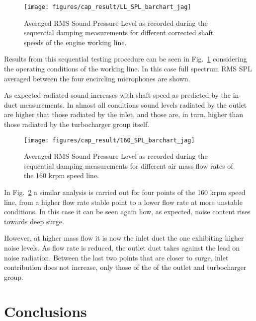 \begin{figure}[tbh!]
\centering
\texttt{[image: figures/cap\_result/LL\_SPL\_barchart\_jag]}
\caption{Averaged RMS Sound Pressure Level as recorded during the sequential damping measurements for different corrected shaft speeds of the engine working line.}
\label{fig:result_spl_radiated_comp_bar_LL}
\end{figure}

Results from this sequential testing procedure can be seen in Fig.~\ref{fig:result_spl_radiated_comp_bar_LL} considering the operating conditions of the working line. In this case full spectrum RMS SPL averaged between the four encircling microphones are shown. 

As expected radiated sound increases with shaft speed as predicted by the in-duct measurements. In almost all conditions sound levels radiated by the outlet are higher that those radiated by the inlet, and those are, in turn, higher than those radiated by the turbocharger group itself.

\begin{figure}[tbh!]
\centering
\texttt{[image: figures/cap\_result/160\_SPL\_barchart\_jag]}
\caption{Averaged RMS Sound Pressure Level as recorded during the sequential damping measurements for different air mass flow rates of the 160 krpm speed line.}
\label{fig:result_spl_radiated_comp_bar_160}
\end{figure}

In Fig.~\ref{fig:result_spl_radiated_comp_bar_160} a similar analysis is carried out for four points of the 160 krpm speed line, from a higher flow rate stable point to a lower flow rate at more unstable conditions. In this case it can be seen again how, as expected, noise content rises towards deep surge.

However, at higher mass flow it is now the inlet duct the one exhibiting higher noise levels. As flow rate is reduced, the outlet duct takes against the lead on noise radiation. Between the last two points that are closer to surge, inlet contribution does not increase, only those of the of the outlet and turbocharger group.


\section{Conclusions}

